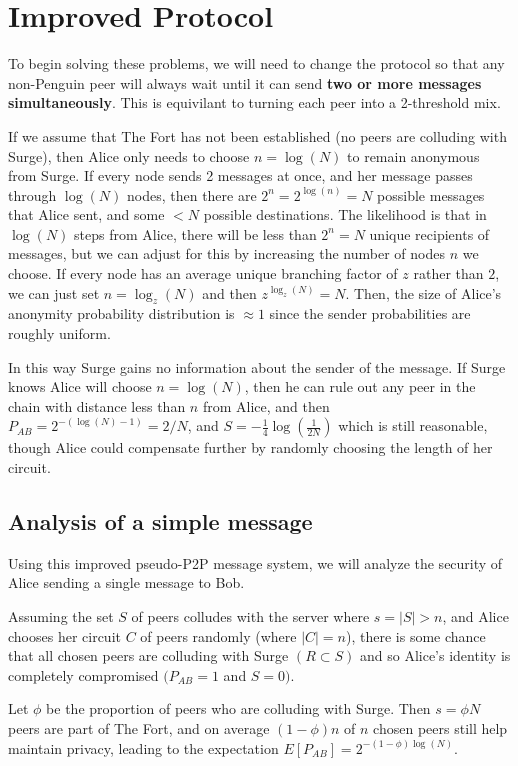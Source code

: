 \documentclass[twocolumn,11pt,english]{article}
\begin{document}
\section{Improved Protocol}
To begin solving these problems, we will need to change the protocol so that any non-Penguin peer will always wait until it can send \textbf{two or more messages simultaneously}. This is equivilant to turning each peer into a 2-threshold mix. \cite{TODO}

If we assume that The Fort has not been established (no peers are colluding with Surge), then Alice only needs to choose $n = \log(N)$ to remain anonymous from Surge. If every node sends 2 messages at once, and her message passes through $\log(N)$ nodes, then there are $2^n = 2^{\log(n)} = N$ possible messages that Alice sent, and some $< N$ possible destinations. The likelihood is that in $\log(N)$ steps from Alice, there will be less than $2^n = N$ unique recipients of messages, but we can adjust for this by increasing the number of nodes $n$ we choose. If every node has an average unique branching factor of $z$ rather than $2$, we can just set $n = \log_z(N)$ and then $z^{\log_z(N)} = N$. Then, the size of Alice's anonymity probability distribution is $\approx 1$ since the sender probabilities are roughly uniform.

In this way Surge gains no information about the sender of the message. If Surge knows Alice will choose $n = \log(N)$, then he can rule out any peer in the chain with distance less than $n$ from Alice, and then $P_{AB} = 2^{-(\log(N)-1)} = 2/N$, and $S = - \frac{1}{4} \log(\frac{1}{2N})$ which is still reasonable, though Alice could compensate further by randomly choosing the length of her circuit. 

\subsection{Analysis of a simple message} 
Using this improved pseudo-P2P message system, we will analyze the security of Alice sending a single message to Bob.

Assuming the set $S$ of peers colludes with the server where $s = |S| > n$, and Alice chooses her circuit $C$ of peers randomly (where $|C| = n$), there is some chance that all chosen peers are colluding with Surge $(R \subset S)$ and so Alice's identity is completely compromised $(P_{AB} = 1$ and $S = 0)$. 

Let $\phi$ be the proportion of peers who are colluding with Surge. Then $s = \phi N$ peers are part of The Fort, and on average $(1 - \phi)n$ of $n$ chosen peers still help maintain privacy, leading to the expectation $E[P_{AB}] = 2^{-(1 - \phi) \log(N)}$. 
\end{document}

